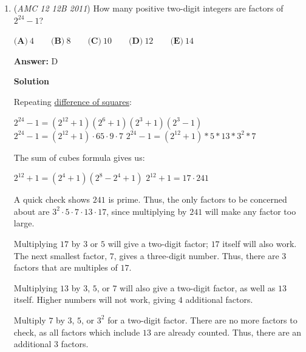 \begin{enumerate}
 -Indefintense

 



\textbf{Solution 5}

Start by drawing a nice diagram. Next, let the directrix of the parabola be $\ell$. We then also let the intersection of line $FV$ and directrix $\ell$ be $X$. We can now let $FV=VX=x$. Now, we draw a segment from $A$ perpendicular to $\ell$ and call the foot of this altitude $Y$. Since $AY=2x$, $AF=2x$. Similarly, $BF=2x$. So, $AV=BV=x\sqrt5$. So, LoC states that 
 \[16x^2=10x^2-10x^2\cos{\angle{AVB}}\] 
 \[\Longrightarrow \cos{\angle{AVB}}=\boxed{-\dfrac{3}{5}}.\]

 -jb2015007

 


	\item (\textit{AMC 12 12B 2011}) How many positive two-digit integers are factors of $2^{24}-1$?


 $\textbf{(A)}\ 4 \qquad \textbf{(B)}\ 8 \qquad \textbf{(C)}\ 10 \qquad \textbf{(D)}\ 12 \qquad \textbf{(E)}\ 14$

 \textbf{Answer: }D



\textbf{Solution}

Repeating \href{https://artofproblemsolving.com/wiki/index.php?title=Difference\_of\_squares}{difference of squares}:

 $2^{24}-1=(2^{12}+1)(2^{6}+1)(2^{3}+1)(2^{3}-1)$
$2^{24}-1=(2^{12}+1)\cdot65\cdot9\cdot7$
$2^{24}-1 = (2^{12} +1) * 5 * 13 * 3^2 * 7$

 The sum of cubes formula gives us: 

 $2^{12}+1=(2^4+1)(2^8-2^4+1)$
$2^{12}+1 = 17\cdot241$

 
A quick check shows $241$ is prime. Thus, the only factors to be concerned about are $3^2\cdot5\cdot7\cdot13\cdot17$, since multiplying by $241$ will make any factor too large.

 Multiplying $17$ by $3$ or $5$ will give a two-digit factor; $17$ itself will also work. The next smallest factor, $7$, gives a three-digit number.  Thus, there are $3$ factors that are multiples of $17$.

 Multiplying $13$ by $3$, $5$, or $7$ will also give a two-digit factor, as well as $13$ itself. Higher numbers will not work, giving $4$ additional factors.

 Multiply $7$ by $3$, $5$, or  $3^2$ for a two-digit factor. There are no more factors to check, as all factors which include $13$ are already counted. Thus, there are an additional $3$ factors.


\end{enumerate}
